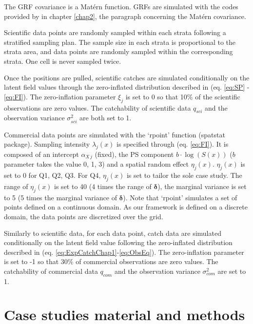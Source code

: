 The GRF covariance is a Matérn function. GRFs are simulated with the codes provided by \textcite{krainski-advanced-2018} in chapter \ref{chap2}, the paragraph concerning the Matérn covariance.

Scientific data points are randomly sampled within each strata following a stratified sampling plan. The sample size in each strata is proportional to the strata area, and data points are randomly sampled within the corresponding strata. One cell is never sampled twice.

Once the positions are pulled, scientific catches are simulated conditionally on the latent field values through the zero-inflated distribution described in (eq. \ref{eq:SP} -\ref{eq:FI}). The zero-inflation parameter \(\xi_j\) is set to 0 so that 10\% of the scientific observations are zero values. The catchability of scientific data \(q_{sci}\) and the observation variance \(\sigma_{sci}^2\) are both set to 1.

Commercial data points are simulated with the ‘rpoint’ function (spatstat package). Sampling intensity \(\lambda_j (x)\) is specified through (eq. \ref{eq:FI}). It is composed of an intercept \(\alpha_{X \, j}\) (fixed), the PS component \(b \cdot \log (S(x)) \) (\(b\) parameter takes the value 0, 1, 3) and a spatial random effect \(\eta_j (x)\). \(\eta_j (x)\) is set to 0 for Q1, Q2, Q3. For Q4, \(\eta_j (x)\) is set to tailor the sole case study. The range of \(\eta_j (x)\) is set to 40 (4 times the range of \(\boldsymbol{\delta}\)), the marginal variance is set to 5 (5 times the marginal variance of \(\boldsymbol{\delta}\)).
Note that ‘rpoint’ simulates a set of points defined on a continuous domain. As our framework is defined on a discrete domain, the data points are discretized over the grid.

Similarly to scientific data, for each data point, catch data are simulated conditionally on the latent field value following the zero-inflated distribution described in (eq. \ref{eq:ExpCatchChap1}-\ref{eq:ObsEq}). The zero-inflation parameter is set to -1 so that 30\% of commercial observations are zero values. The catchability of commercial data \(q_{com}\) and the observation variance \(\sigma_{com}^2\) are set to 1.

\newpage

\section{Case studies material and methods}\label{appendix:CaseStMandM}

